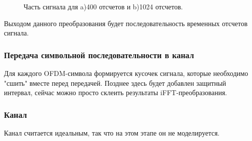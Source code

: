 \begin{figure}[h!]
\begin{minipage}[h]{\linewidth}
\end{minipage}
\begin{minipage}[h]{\linewidth}
\end{minipage}
\caption{Часть сигнала для a)400 отсчетов и b)1024 отсчетов.}
\label{fg:fft400}
\end{figure}

Выходом данного преобразования будет последовательность временных отсчетов сигнала.

 \subsubsection*{Передача символьной последовательности в канал}
 
Для каждого OFDM-символа формируется кусочек сигнала, которые необходимо "сшить" вместе перед передачей. 
Позднее здесь будет добавлен защитный интервал, сейчас можно просто склеить результаты iFFT-преобразования.

\subsubsection{Канал}

Канал считается идеальным, так что на этом этапе он не моделируется. 

